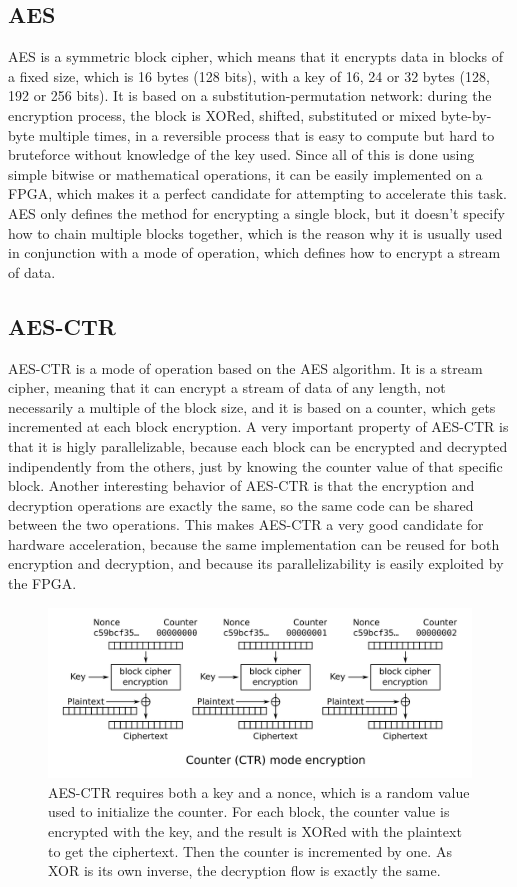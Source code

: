 \documentclass[12pt,oneside,a4paper]{article}
\begin{document}
\subsection{AES} \label{subsec:aes}
AES is a symmetric block cipher, which means that it encrypts data in blocks of a fixed size, which is 16 bytes (128 bits), with a key of 16, 24 or 32 bytes (128, 192 or 256 bits).
It is based on a substitution-permutation network: during the encryption process, the block is XORed, shifted, substituted or mixed byte-by-byte multiple times, in a reversible process that is easy to compute but hard to bruteforce without knowledge of the key used.
Since all of this is done using simple bitwise or mathematical operations, it can be easily implemented on a FPGA, which makes it a perfect candidate for attempting to accelerate this task.
\\AES only defines the method for encrypting a single block, but it doesn't specify how to chain multiple blocks together, which is the reason why it is usually used in conjunction with a mode of operation, which defines how to encrypt a stream of data.

\subsection{AES-CTR} \label{subsec:aes-ctr}
AES-CTR is a mode of operation based on the AES algorithm. It is a stream cipher, meaning that it can encrypt a stream of data of any length, not necessarily a multiple of the block size, and it is based on a counter, which gets incremented at each block encryption.
A very important property of AES-CTR is that it is higly parallelizable, because each block can be encrypted and decrypted indipendently from the others, just by knowing the counter value of that specific block.
Another interesting behavior of AES-CTR is that the encryption and decryption operations are exactly the same, so the same code can be shared between the two operations.
This makes AES-CTR a very good candidate for hardware acceleration, because the same implementation can be reused for both encryption and decryption, and because its parallelizability is easily exploited by the FPGA.
\begin{figure}[h!]
	\centering
	\includegraphics[width=\textwidth]{CTR_encryption_scheme.png}
	\caption{AES-CTR requires both a key and a nonce, which is a random value used to initialize the counter. For each block, the counter value is encrypted with the key, and the result is XORed with the plaintext to get the ciphertext. Then the counter is incremented by one. As XOR is its own inverse, the decryption flow is exactly the same. \cite{pic:aes-ctr}}
\end{figure}
\end{document}
